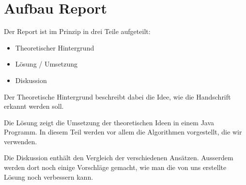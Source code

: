 \chapter{Aufbau Report}
Der Report ist im Prinzip in drei Teile aufgeteilt:
\begin{itemize}
\item Theoretischer Hintergrund
\item Lösung / Umsetzung
\item Diskussion
\end{itemize}

Der Theoretische Hintergrund beschreibt dabei die Idee, wie die Handschrift erkannt werden soll. 

Die Lösung zeigt die Umsetzung der theoretischen Ideen in einem Java Programm. In diesem Teil werden vor allem die Algorithmen vorgestellt, die wir verwenden.

Die Diskussion enthält den Vergleich der verschiedenen Ansätzen. Ausserdem werden dort noch einige Vorschläge gemacht, wie man die von uns erstellte Lösung noch verbessern kann.